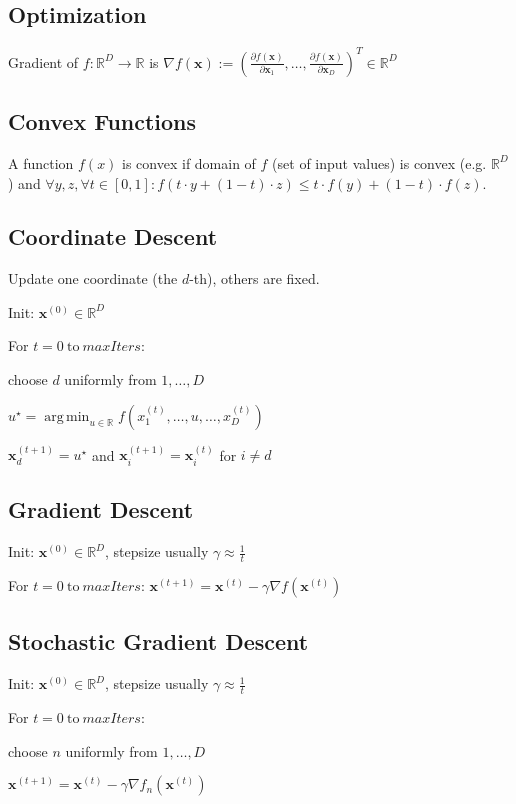 \documentclass[a4paper, 11pt, landscape]{article}
\DeclareMathOperator*{\argmin}{arg\,min}
\begin{document}
\begin{multicols*}{3}
\section{Optimization}
Gradient of $f: \mathbb{R}^D \to \mathbb{R}$ is $\nabla f(\mathbf{x}) := \left( \frac{\partial f(\mathbf{x})}{\partial \mathbf{x}_1}, \ldots, \frac{\partial f(\mathbf{x})}{\partial \mathbf{x}_D} \right)^T \in \mathbb{R}^D$

\subsection{Convex Functions}
A function $f(x)$ is convex if domain of $f$ (set of input values) is convex (e.g. $\mathbb{R}^D$) and $\forall y, z, \forall t \in [0, 1]: f(t \cdot y + (1-t) \cdot z) \leq t \cdot f(y) + (1-t) \cdot f(z)$.

\subsection{Coordinate Descent}
Update one coordinate (the $d$-th), others are fixed.
\begin{inparaenum}
	\item Init: $\mathbf{x}^{(0)} \in \mathbb{R}^D$
	\item For $t = 0 \ \text{to} \ \mathit{maxIters}$:
	\item choose $d$ uniformly from $1, \ldots, D$
	\item $u^\star = \argmin_{u \in \mathbb{R}} f(x_1^{(t)}, \ldots, u, \ldots, x_D^{(t)})$
	\item $\mathbf{x}_d^{(t+1)} = u^\star$ and $\mathbf{x}_i^{(t+1)} = \mathbf{x}_i^{(t)}$ for $i \neq d$
\end{inparaenum}

\subsection{Gradient Descent}
\begin{inparaenum}
	\item Init: $\mathbf{x}^{(0)} \in \mathbb{R}^D$, stepsize usually $\gamma \approx \frac{1}{t}$
	\item For $t = 0 \ \text{to} \ \mathit{maxIters}$: $\mathbf{x}^{(t+1)} = \mathbf{x}^{(t)} - \gamma \nabla f(\mathbf{x}^{(t)})$
\end{inparaenum}

\subsection{Stochastic Gradient Descent}
\begin{inparaenum}
	\item Init: $\mathbf{x}^{(0)} \in \mathbb{R}^D$, stepsize usually $\gamma \approx \frac{1}{t}$
	\item For $t = 0 \ \text{to} \ \mathit{maxIters}$:
	\item choose $n$ uniformly from $1, \ldots, D$
	\item $\mathbf{x}^{(t+1)} = \mathbf{x}^{(t)} - \gamma \nabla f_n(\mathbf{x}^{(t)})$
\end{inparaenum}


\end{multicols*}
\end{document}
